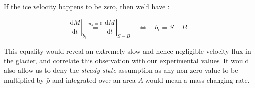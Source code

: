 If the ice velocity happens to be zero, then we'd have :

\begin{equation}\left. \frac{\mathrm{d} M}{\mathrm{d}t} \right|_{\dot{b}_i} \stackrel{u_s = 0}{=} \left. \frac{\mathrm{d} M}{\mathrm{d}t} \right|_{S-B}
\quad
\Leftrightarrow
\quad
\boxed{\dot{b}_i = S-B}
\end{equation}

This equality would reveal an extremely slow and hence negligible velocity flux in the glacier, and correlate this observation with our experimental values. It would also allow us to deny the \textit{steady state} assumption as any non-zero value to be multiplied by $\bar{\rho}$ and integrated over an area $A$ would mean a mass changing rate.
